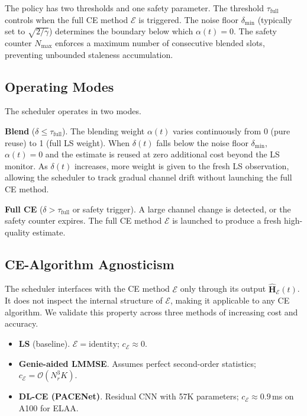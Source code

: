The policy has two thresholds and one safety parameter.
The threshold $\tau_{\mathrm{full}}$ controls when the full CE method $\mathcal{E}$ is triggered.
The noise floor $\delta_{\min}$ (typically set to $\sqrt{2/\gamma}$) determines the boundary below which $\alpha(t) = 0$.
The safety counter $N_{\max}$ enforces a maximum number of consecutive blended slots, preventing unbounded staleness accumulation.

\subsection{Operating Modes}

The scheduler operates in two modes.

\textbf{Blend} ($\delta \leq \tau_{\mathrm{full}}$).
The blending weight $\alpha(t)$ varies continuously from 0 (pure reuse) to 1 (full LS weight).
When $\delta(t)$ falls below the noise floor $\delta_{\min}$, $\alpha(t) = 0$ and the estimate is reused at zero additional cost beyond the LS monitor.
As $\delta(t)$ increases, more weight is given to the fresh LS observation, allowing the scheduler to track gradual channel drift without launching the full CE method.

\textbf{Full CE} ($\delta > \tau_{\mathrm{full}}$ or safety trigger).
A large channel change is detected, or the safety counter expires. The full CE method $\mathcal{E}$ is launched to produce a fresh high-quality estimate.

\subsection{CE-Algorithm Agnosticism}

The scheduler interfaces with the CE method $\mathcal{E}$ only through its output $\hat{\mathbf{H}}_{\mathcal{E}}(t)$.
It does not inspect the internal structure of $\mathcal{E}$, making it applicable to any CE algorithm.
We validate this property across three methods of increasing cost and accuracy.
%
\begin{itemize}
\item \textbf{LS} (baseline). $\mathcal{E} = \mathrm{identity}$; $c_{\mathcal{E}} \approx 0$.
\item \textbf{Genie-aided LMMSE}. Assumes perfect second-order statistics; $c_{\mathcal{E}} = \mathcal{O}(N_r^3 K)$.
\item \textbf{DL-CE (PACENet)}. Residual CNN with 57K parameters; $c_{\mathcal{E}} \approx 0.9$\,ms on A100 for ELAA.
\end{itemize}

